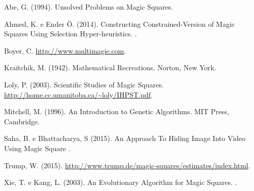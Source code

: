 \documentclass[italian,twoside,twocolumn]{article}
\begin{document}
\begin{thebibliography}{99} 
\hspace*{-10pt}
\vspace*{-10pt}
\begin{minipage}[t]{0.45\columnwidth}
\vspace*{-10pt}
	\small
	Abe, G. (1994).
	\newblock Unsolved Problems on Magic Squares.
	
	Ahmed, K. e Ender Ö. (2014).
	\newblock Constructing Constrained-Version of Magic Squares Using Selection Hyper-heuristics.
	.
	
	Boyer, C. 
	\newblock \url{http://www.multimagie.com}.
	
	Kraitchik, M. (1942).
	\newblock Mathematical Recreations.
	\newblock Norton, New York.
	
	Loly, P. (2003).
	\newblock Scientific Studies of Magic Squares.
	\newblock \url{http://home.cc.umanitoba.ca/~loly/IHPST.pdf}.

\end{minipage}
% 
\hspace*{20pt}
\begin{minipage}[t]{0.45\columnwidth}
\vspace*{-10pt}	
	\small


Mitchell, M. (1996).
\newblock An Introduction to Genetic Algorithms.
\newblock MIT Press, Cambridge.

Saha, B. e Bhattacharya, S (2015).
\newblock An Approach To Hiding Image Into Video  Using Magic Square
.


Trump, W. (2015).
\newblock \url{http://www.trump.de/magic-squares/estimates/index.html}.

Xie, T. e Kang, L. (2003).
\newblock An Evolutionary Algorithm for Magic Squares.
.

\end{minipage}
\end{thebibliography}
\end{document}
